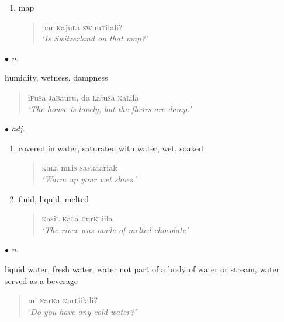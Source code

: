 \documentclass[a4paper,10pt,twoside,openright]{memoir}
\newcommand{\famword}[5]{#1\textsc{#2}#3\textsc{#4}#5}
\newcommand{\newentry}[2]{%
\item[#1] $\bullet$ \textit{#2}\hfill
}%
\begin{document}
\begin{multicols*}{2}
\begin{description}[leftmargin=*]
\begin{enumerate}
\begin{quote}
        \end{quote}
        \item map
            \begin{quote}
                par \famword{}{k}{aju}{l}{a} \famword{}{sw}{uu}{t}{ilali}?\\
                \textit{`Is Switzerland on that map?'}
            \end{quote}
    \end{enumerate}
    \newentry{\famword{}{k}{a}{l}{}}{n.}
    \begin{description}[labelwidth=*]
        \item[] humidity, wetness, dampness
        \begin{quote}
            \famword{i}{f}{u}{s}{a} \famword{}{j}{a}{b}{auru}, da \famword{}{l}{aju}{s}{a} \famword{}{k}{a}{l}{ila}\\
            \textit{`The house is lovely, but the floors are damp.'}
        \end{quote}
    \end{description}
    \newentry{\famword{}{k}{a}{l}{a}}{adj.} 
    \begin{enumerate}
        \item covered in water, saturated with water, wet, soaked
        \begin{quote}
            \famword{}{k}{a}{l}{a} \famword{m}{l}{i}{s}{} \famword{}{s}{a}{fr}{aariak}\\
            \textit{`Warm up your wet shoes.'}
        \end{quote}
        \item fluid, liquid, melted
        \begin{quote}
            \famword{}{k}{asi}{l}{} \famword{}{k}{a}{l}{a} \famword{}{c}{ur}{kl}{iila}\\
            \textit{`The river was made of melted chocolate'}
        \end{quote}
    \end{enumerate}
    \newentry{\famword{}{k}{ar}{l}{i}}{n.}
    \begin{description}[labelwidth=*]
        \item[] liquid water, fresh water, water not part of a body of water or stream, water served as a beverage
        \begin{quote}
            mi \famword{}{n}{ar}{k}{a} \famword{}{k}{ar}{l}{iilali}?\\
            \textit{`Do you have any cold water?'}

\end{quote}
\end{description}
\end{description}
\end{multicols*}
\end{document}
